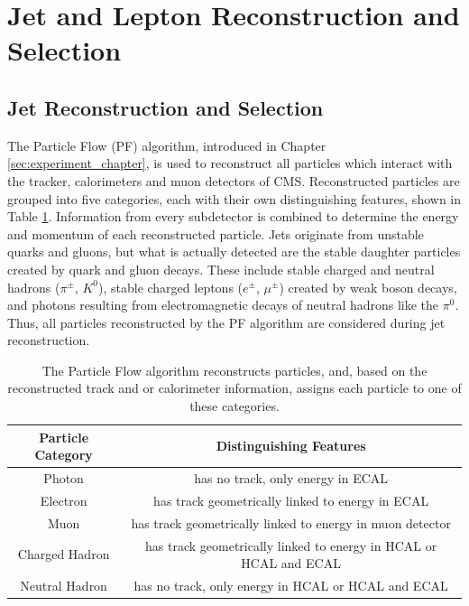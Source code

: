 \section{Jet and Lepton Reconstruction and Selection}

\subsection{Jet Reconstruction and Selection}
\label{jetRecoAndSelection}
The Particle Flow (PF) algorithm, introduced in Chapter \ref{sec:experiment_chapter}, is used
to reconstruct all particles which interact with the tracker, calorimeters and muon
detectors of CMS.  Reconstructed particles are grouped into five categories, each with their
own distinguishing features, shown in Table \ref{tab:pfRecoBins}.  Information
from every subdetector is combined to determine the energy and momentum of
each reconstructed particle.  Jets originate from unstable quarks and gluons,
but what is actually detected are the stable daughter particles created by
quark and gluon decays.  These include stable charged and neutral hadrons ($\pi^{\pm}$,
$K^{0}$), stable charged leptons ($e^{\pm}$, $\mu^{\pm}$) created by weak boson
decays, and photons resulting from electromagnetic decays of neutral hadrons like
the $\pi^{0}$.  Thus, all particles reconstructed by the PF algorithm are considered
during jet reconstruction.

\begin{table}[h]
\caption{The Particle Flow algorithm reconstructs particles, and, based on the reconstructed
track and or calorimeter information, assigns each particle to one of these categories.}
\label{tab:pfRecoBins}
\centering
\begin{tabular}{c|c}
Particle Category & Distinguishing Features \\  \hline
	Photon &  has no track, only energy in ECAL  \\ \hline
	Electron &  has track geometrically linked to energy in ECAL  \\ \hline
	Muon &  has track geometrically linked to energy in muon detector  \\ \hline
	Charged Hadron &  has track geometrically linked to energy in HCAL or HCAL and ECAL  \\ \hline
	Neutral Hadron &  has no track, only energy in HCAL or HCAL and ECAL  \\ \hline
\end{tabular}
\end{table}

